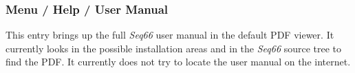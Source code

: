 \subsubsection{Menu / Help / User Manual}
\label{subsubsec:menu_help_user_manual}

   This entry brings up the full \textsl{Seq66} user manual in the default
   PDF viewer.  It currently looks in the possible installation areas and in
   the \textsl{Seq66} source tree to find the PDF.
   It currently does not try to locate the user manual on the internet.


